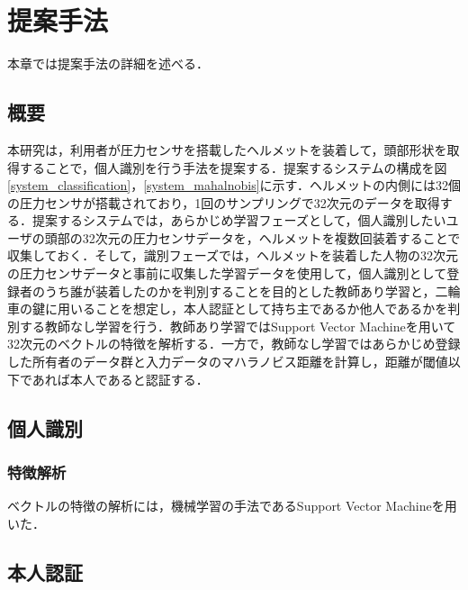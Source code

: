 \documentclass[Japanese,noauthor]{dicomopapers}
\begin{document}
\section{提案手法}
\label{method}
本章では提案手法の詳細を述べる．

\subsection{概要}
本研究は，利用者が圧力センサを搭載したヘルメットを装着して，頭部形状を取得することで，個人識別を行う手法を提案する．提案するシステムの構成を図\ref{system_classification}，\ref{system_mahalnobis}に示す．ヘルメットの内側には32個の圧力センサが搭載されており，1回のサンプリングで32次元のデータを取得する．提案するシステムでは，あらかじめ学習フェーズとして，個人識別したいユーザの頭部の32次元の圧力センサデータを，ヘルメットを複数回装着することで収集しておく．そして，識別フェーズでは，ヘルメットを装着した人物の32次元の圧力センサデータと事前に収集した学習データを使用して，個人識別として登録者のうち誰が装着したのかを判別することを目的とした教師あり学習と，二輪車の鍵に用いることを想定し，本人認証として持ち主であるか他人であるかを判別する教師なし学習を行う．教師あり学習ではSupport Vector Machineを用いて32次元のベクトルの特徴を解析する．一方で，教師なし学習ではあらかじめ登録した所有者のデータ群と入力データのマハラノビス距離を計算し，距離が閾値以下であれば本人であると認証する．

\subsection{個人識別}
\subsubsection{特徴解析}
ベクトルの特徴の解析には，機械学習の手法であるSupport Vector Machineを用いた．

\subsection{本人認証}
\end{document}
